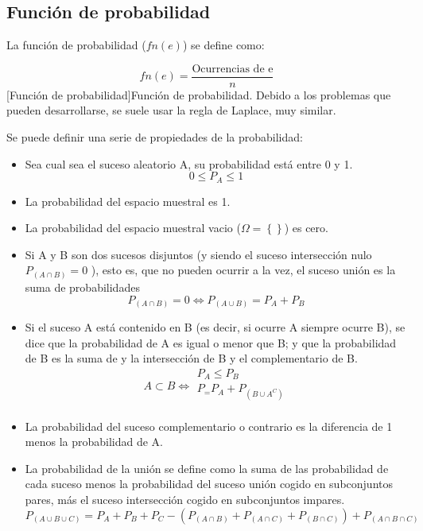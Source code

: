 \subsection{Función de probabilidad}
La función de probabilidad ($fn(e)$) se define como:
\begin{center}
    \begin{equation}
       fn(e) = \dfrac{\mbox{Ocurrencias de e}}{n}
    \end{equation}
    [Función de probabilidad]{Función de probabilidad. Debido a los problemas que pueden desarrollarse, se suele usar la regla de Laplace, muy similar.}
\end{center}

Se puede definir una serie de propiedades de la probabilidad:
\begin{itemize}[itemsep=0pt,parsep=0pt,topsep=0pt,partopsep=0pt]
    \item Sea cual sea el suceso aleatorio A, su probabilidad está entre 0 y 1.
        \[ 0 \leq P_A \leq 1 \]
    \item La probabilidad del espacio muestral es 1.
    \item La probabilidad del espacio muestral vacio ($\Omega = \left\lbrace \right\rbrace $)  es cero.
    \item Si A y B son dos sucesos disjuntos  (y siendo el suceso intersección nulo $P_{\left( A\cap B\right) } = 0$ ), esto es, que no pueden ocurrir a la vez, el suceso unión es la suma de probabilidades
        \[ P_{\left( A\cap B\right) } = 0 \iff P_{\left( A\cup B\right) } = P_A + P_B \]
    \item Si el suceso A está contenido en B (es decir, si ocurre A siempre ocurre B), se dice que la probabilidad de A es igual o menor que B; y que la probabilidad de B es la suma de y la intersección de B y el complementario de B.
        \begin{equation*}
            A \subset B \iff
             \begin{array}{c}
                    P_A \leq P_B\\
                    P_ = P_A + P_{\left( B\cup A^C\right) }\\
            \end{array}
        \end{equation*}
    \item La probabilidad del suceso complementario o contrario es la diferencia de 1 menos la probabilidad de A.
    \item La probabilidad de la unión se define como la suma de las probabilidad de cada suceso menos la probabilidad del suceso unión cogido en subconjuntos pares, más el suceso intersección cogido en subconjuntos impares.
        \[ P_{\left( A\cup B\cup C\right) } = P_A + P_B + P_C - \left( P_{\left( A\cap B\right) } + P_{\left( A\cap C\right) }  + P_{\left( B\cap C\right) } \right)  + P_{\left( A\cap B\cap C\right) } \]
\end{itemize}
